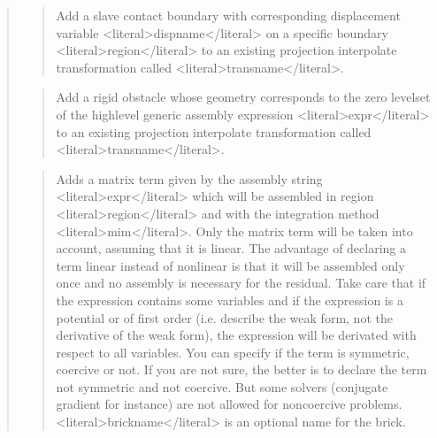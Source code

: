 \documentclass[a4paper,11pt,english]{sphinxmanual}
\begin{document}
\begin{quote}
\sphinxAtStartPar
{}
\begin{quote}

\sphinxAtStartPar
Add a slave contact boundary with corresponding displacement variable
\textless{}literal\textgreater{}dispname\textless{}/literal\textgreater{} on a specific boundary \textless{}literal\textgreater{}region\textless{}/literal\textgreater{} to an existing projection
interpolate transformation called \textless{}literal\textgreater{}transname\textless{}/literal\textgreater{}.
\end{quote}

\sphinxAtStartPar
{}
\begin{quote}

\sphinxAtStartPar
Add a rigid obstacle whose geometry corresponds to the zero level\sphinxhyphen{}set
of the high\sphinxhyphen{}level generic assembly expression \textless{}literal\textgreater{}expr\textless{}/literal\textgreater{}
to an existing projection interpolate transformation called \textless{}literal\textgreater{}transname\textless{}/literal\textgreater{}.
\end{quote}

\sphinxAtStartPar
{}
\begin{quote}

\sphinxAtStartPar
Adds a matrix term given by the assembly string \textless{}literal\textgreater{}expr\textless{}/literal\textgreater{} which will
be assembled in region \textless{}literal\textgreater{}region\textless{}/literal\textgreater{} and with the integration method \textless{}literal\textgreater{}mim\textless{}/literal\textgreater{}.
Only the matrix term will be taken into account, assuming that it is
linear.
The advantage of declaring a term linear instead of nonlinear is that
it will be assembled only once and no assembly is necessary for the
residual.
Take care that if the expression contains some variables and if the
expression is a potential or of first order (i.e. describe the weak
form, not the derivative of the weak form), the expression will be
derivated with respect to all variables.
You can specify if the term is symmetric, coercive or not.
If you are not sure, the better is to declare the term not symmetric
and not coercive. But some solvers (conjugate gradient for instance)
are not allowed for non\sphinxhyphen{}coercive problems.
\textless{}literal\textgreater{}brickname\textless{}/literal\textgreater{} is an optional name for the brick.
\end{quote}


\end{quote}
\end{document}
